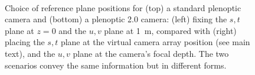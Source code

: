 \documentclass[onecolumn]{article}
\begin{document}
\begin{figure}[b!]
	\centering
		\hfil
	\\
	\hfil
	\caption{Choice of reference plane positions for (top) a standard plenoptic camera and (bottom) a plenoptic 2.0 camera: (left) fixing the $s,t$ plane at $z=0$ and the $u,v$ plane at 1~m, compared with (right) placing the $s,t$ plane at the virtual camera array position (see main text), and the $u,v$ plane at the camera's focal depth. The two scenarios convey the same information but in different forms.}
	\label{fig_RefPlaneIntuition}
\end{figure}
\end{document}
